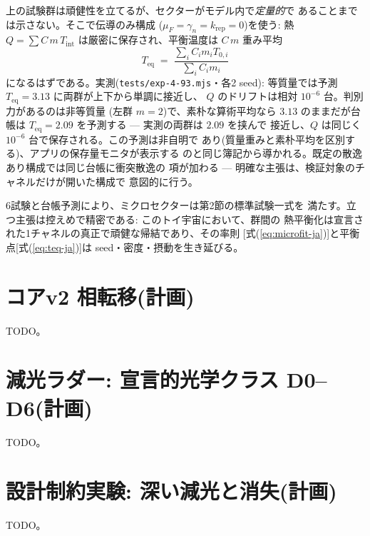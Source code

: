 \documentclass[a4paper,10pt,twocolumn]{ltjsarticle}
\begin{document}
上の試験群は頑健性を立てるが、セクターがモデル内で\emph{定量的}で
あることまでは示さない。そこで伝導のみ構成
($\mu_F=\gamma_n=k_{\mathrm{rep}}=0$)を使う: 熱
$Q=\sum C\,m\,T_{\mathrm{int}}$ は厳密に保存され、平衡温度は
$C\,m$ 重み平均
\begin{equation}
T_{\mathrm{eq}} \;=\; \frac{\sum_i C_i m_i T_{0,i}}{\sum_i C_i m_i}
\label{eq:teq-ja}
\end{equation}
になるはずである。実測(\texttt{tests/exp-4-93.mjs}・各2 seed):
等質量では予測 $T_{\mathrm{eq}}=3.13$ に両群が上下から単調に接近し、
$Q$ のドリフトは相対 $10^{-6}$ 台。判別力があるのは非等質量
(左群 $m=2$)で、素朴な算術平均なら $3.13$ のままだが台帳は
$T_{\mathrm{eq}}=2.09$ を予測する — 実測の両群は $2.09$ を挟んで
接近し、$Q$ は同じく $10^{-6}$ 台で保存される。この予測は非自明で
あり(質量重みと素朴平均を区別する)、アプリの保存量モニタが表示する
のと同じ簿記から導かれる。既定の散逸あり構成では同じ台帳に衝突散逸の
項が加わる — 明確な主張は、検証対象のチャネルだけが開いた構成で
意図的に行う。

6試験と台帳予測により、ミクロセクターは第2節の標準試験一式を
満たす。立つ主張は控えめで精密である: このトイ宇宙において、群間の
熱平衡化は宣言された1チャネルの真正で頑健な帰結であり、その率則
[式(\ref{eq:microfit-ja})]と平衡点[式(\ref{eq:teq-ja})]は
seed・密度・摂動を生き延びる。

\section{コアv2 相転移(計画)}
TODO。

\section{減光ラダー: 宣言的光学クラス D0--D6(計画)}
TODO。

\section{設計制約実験: 深い減光と消失(計画)}
TODO。
\end{document}
